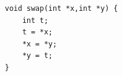 \documentclass{jarticle}
\begin{document}
\begin{Verbatim}
void swap(int *x,int *y) {
    int t;
    t = *x;
    *x = *y;
    *y = t;
}
\end{Verbatim}
\end{document}
